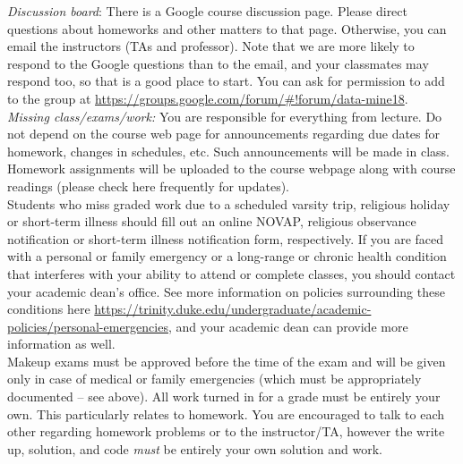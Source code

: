 \documentclass[11pt]{article}
\begin{document}
\emph{Discussion board}:
There is a Google course discussion page. Please direct questions about homeworks and other matters to that page. Otherwise, you can email the instructors (TAs and professor). Note that we are more likely to respond to the Google questions than to the email, and your classmates may respond too, so that is a good place to start. You can ask for permission to add to the group at \url{https://groups.google.com/forum/#!forum/data-mine18}.\\



\emph{Missing class/exams/work:}
You are responsible for everything from lecture. Do not depend on the course web page for announcements regarding due dates for homework, changes in schedules, etc. Such announcements will be made in class. Homework assignments will be uploaded to the course webpage along with course readings (please check here frequently for updates).\\

Students who miss graded work due to a scheduled varsity trip, religious holiday or short-term illness should fill out an online NOVAP, religious observance notification or short-term illness notification form, respectively. If you are faced with a personal or family emergency or a long-range or chronic health condition that interferes with your ability to attend or complete classes, you should contact your academic dean's office. See more information on policies surrounding these conditions here \url{https://trinity.duke.edu/undergraduate/academic-policies/personal-emergencies}, and your academic dean can provide more information as well.\\

Makeup exams must be approved before the time of the exam and will be given only in case
of medical or family emergencies (which must be appropriately documented -- see above). All work turned in for a grade must be entirely your own. This particularly relates to homework. You are encouraged to talk to each other regarding homework problems or to the instructor/TA, however the write up, solution, and code \emph{must} be entirely your own solution and work. \\
\end{document}
